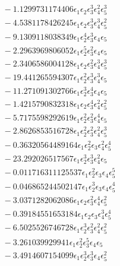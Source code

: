 \documentclass[10pt]{article}
\begin{document}
\begin{align*}
&{}  - 1.1299731174406 \epsilon_{1} \epsilon_{2} \epsilon_{3}^{3} \epsilon_{4}^{2} \epsilon_{5}^{3} \\
&{}  - 4.5381178426245 \epsilon_{1} \epsilon_{2} \epsilon_{3}^{3} \epsilon_{4}^{3} \epsilon_{5}^{2} \\
&{}  - 9.1309118038349 \epsilon_{1} \epsilon_{2}^{4} \epsilon_{3}^{3} \epsilon_{4} \epsilon_{5} \\
&{}  - 2.2963969806052 \epsilon_{1} \epsilon_{2}^{5} \epsilon_{3}^{2} \epsilon_{4} \epsilon_{5} \\
&{}  - 2.3406586004128 \epsilon_{1} \epsilon_{2} \epsilon_{3}^{2} \epsilon_{4}^{3} \epsilon_{5}^{3} \\
&{}  - 19.441265594307 \epsilon_{1} \epsilon_{2}^{2} \epsilon_{3}^{3} \epsilon_{4}^{3} \epsilon_{5} \\
&{}  - 11.271091302766 \epsilon_{1} \epsilon_{2}^{3} \epsilon_{3}^{4} \epsilon_{4} \epsilon_{5} \\
&{}  - 1.4215790832318 \epsilon_{1} \epsilon_{2} \epsilon_{3}^{4} \epsilon_{4}^{2} \epsilon_{5}^{2} \\
&{}  - 5.7175598292619 \epsilon_{1} \epsilon_{2}^{2} \epsilon_{3}^{2} \epsilon_{4}^{4} \epsilon_{5} \\
&{}  - 2.8626853516728 \epsilon_{1} \epsilon_{2}^{2} \epsilon_{3}^{2} \epsilon_{4}^{2} \epsilon_{5}^{3} \\
&{}  - 0.36320564489164 \epsilon_{1} \epsilon_{2}^{2} \epsilon_{3} \epsilon_{4}^{2} \epsilon_{5}^{4} \\
&{}  - 23.292026517567 \epsilon_{1} \epsilon_{2}^{3} \epsilon_{3}^{3} \epsilon_{4}^{2} \epsilon_{5} \\
&{}  - 0.011716311125537 \epsilon_{1} \epsilon_{2}^{2} \epsilon_{3} \epsilon_{4} \epsilon_{5}^{5} \\
&{}  - 0.046865244502147 \epsilon_{1} \epsilon_{2}^{3} \epsilon_{3} \epsilon_{4} \epsilon_{5}^{4} \\
&{}  - 3.0371282062086 \epsilon_{1} \epsilon_{2} \epsilon_{3}^{2} \epsilon_{4}^{4} \epsilon_{5}^{2} \\
&{}  - 0.39184551653184 \epsilon_{1} \epsilon_{2} \epsilon_{3} \epsilon_{4}^{3} \epsilon_{5}^{4} \\
&{}  - 6.5025526746728 \epsilon_{1} \epsilon_{2}^{3} \epsilon_{3}^{2} \epsilon_{4}^{2} \epsilon_{5}^{2} \\
&{}  - 3.261039929941 \epsilon_{1} \epsilon_{2}^{2} \epsilon_{3}^{5} \epsilon_{4} \epsilon_{5} \\
&{}  - 3.4914607154099 \epsilon_{1} \epsilon_{2}^{3} \epsilon_{3}^{3} \epsilon_{4} \epsilon_{5}^{2} \\

\end{align*}
\end{document}
